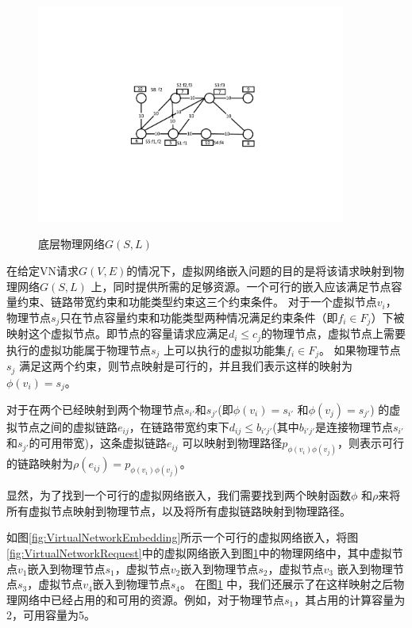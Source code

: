 \begin{figure}[htb]
\centering
\includegraphics[width=4in]{figures/PhysicalNetwork}\\
\caption{底层物理网络$G(S,L)$}\label{fig:PhysicalNetwork}
\end{figure}

在给定VN请求$G (V,E)$的情况下，虚拟网络嵌入问题的目的是将该请求映射到物理网络$G (S,L)$ 上，同时提供所需的足够资源。一个可行的嵌入应该满足节点容量约束、链路带宽约束和功能类型约束这三个约束条件。
对于一个虚拟节点$v_i$，物理节点$s_j$只在节点容量约束和功能类型两种情况满足约束条件（即${f_i} \in {F_j}$）下被映射这个虚拟节点。即节点的容量请求应满足$d_i\leq c_j$的物理节点，虚拟节点上需要执行的虚拟功能属于物理节点$s_j$ 上可以执行的虚拟功能集${f_i} \in {F_j}$。 如果物理节点$s_j$ 满足这两个约束，则节点映射是可行的，并且我们表示这样的映射为$\phi ({v_i}) = {s_j}$。

对于在两个已经映射到两个物理节点$s_{i'}$和$s_{j'}$(即$\phi({v_i}) = {s_{i'}}$ 和$\phi({v_j}) = {s_{j'}}$) 的虚拟节点之间的虚拟链路$e_{ij}$，在链路带宽约束下$d_{ij}\leq b_{i'j'}$(其中$b_{i'j'}$是连接物理节点$s_{i'}$ 和$s_{j'}$的可用带宽)，这条虚拟链路$e_{ij}$ 可以映射到物理路径$p_{\phi({v_i}) \phi({v_j})}$，则表示可行的链路映射为$\rho(e_{ij}) = p_{\phi({v_i}) \phi({v_j})}$。

显然，为了找到一个可行的虚拟网络嵌入，我们需要找到两个映射函数$\phi$ 和$\rho$来将所有虚拟节点映射到物理节点，以及将所有虚拟链路映射到物理路径。

如图\ref{fig:VirtualNetworkEmbedding}所示一个可行的虚拟网络嵌入，将图\ref{fig:VirtualNetworkRequest}中的虚拟网络嵌入到图\ref{fig:PhysicalNetwork}中的物理网络中，其中虚拟节点$v_1$嵌入到物理节点$s_1$，虚拟节点$v_2$嵌入到物理节点$s_2$，虚拟节点$v_3$ 嵌入到物理节点$s_3$，虚拟节点$v_4$嵌入到物理节点$s_4$。 在图\ref{fig:PhysicalNetwork} 中，我们还展示了在这样映射之后物理网络中已经占用的和可用的资源。例如，对于物理节点$s_1$，其占用的计算容量为2，可用容量为5。

